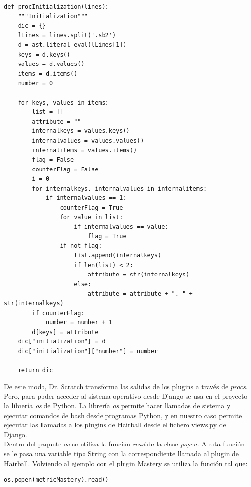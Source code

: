 \documentclass[a4paper, 12pt]{book}
\begin{document}
\begingroup
\fontsize{8pt}{9pt}\selectfont
\begin{verbatim}

def procInitialization(lines):
    """Initialization"""
    dic = {}
    lLines = lines.split('.sb2')
    d = ast.literal_eval(lLines[1])
    keys = d.keys()
    values = d.values()
    items = d.items()
    number = 0
    
    for keys, values in items:
        list = []
        attribute = ""
        internalkeys = values.keys()
        internalvalues = values.values()
        internalitems = values.items()
        flag = False
        counterFlag = False
        i = 0
        for internalkeys, internalvalues in internalitems:
            if internalvalues == 1:
                counterFlag = True
                for value in list:
                    if internalvalues == value:
                        flag = True
                if not flag:
                    list.append(internalkeys)
                    if len(list) < 2:
                        attribute = str(internalkeys)
                    else:
                        attribute = attribute + ", " + str(internalkeys)
        if counterFlag:
            number = number + 1
        d[keys] = attribute      
    dic["initialization"] = d
    dic["initialization"]["number"] = number

    return dic
\end{verbatim}
\endgroup



De este modo, Dr. Scratch transforma las salidas de los plugins a través de \emph{procs}. 
Pero, para poder acceder al sistema operativo desde Django se usa en el proyecto la
librería \emph{os} de Python. La librería \emph{os} permite hacer llamadas de sistema y
ejecutar comandos de bash desde programas Python, y en nuestro caso permite ejecutar las
llamadas a los plugins de Hairball desde el fichero views.py de Django. \\

Dentro del paquete \emph{os} se utiliza la función \emph{read} de la clase \emph{popen}.
A esta función se le pasa una variable tipo String con la correspondiente llamada al 
plugin de Hairball. Volviendo al ejemplo con el plugin Mastery se utiliza la función 
tal que: \\

\begingroup
\fontsize{8pt}{9pt}\selectfont
\begin{verbatim}
os.popen(metricMastery).read()
\end{verbatim}
\endgroup
\end{document}
